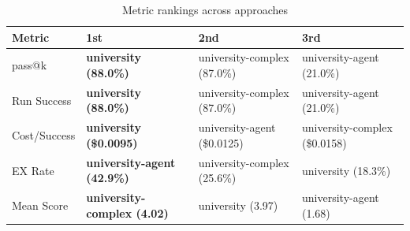 \begin{table}[htbp]
\centering
\caption{Metric rankings across approaches}
\label{tab:rankings}
\begin{tabular}{llll}
\toprule
Metric & 1st & 2nd & 3rd \\
\midrule
pass@k & \textbf{university (88.0\%)} & university-complex (87.0\%) & university-agent (21.0\%) \\
Run Success & \textbf{university (88.0\%)} & university-complex (87.0\%) & university-agent (21.0\%) \\
Cost/Success & \textbf{university (\$0.0095)} & university-agent (\$0.0125) & university-complex (\$0.0158) \\
EX Rate & \textbf{university-agent (42.9\%)} & university-complex (25.6\%) & university (18.3\%) \\
Mean Score & \textbf{university-complex (4.02)} & university (3.97) & university-agent (1.68) \\
\bottomrule
\end{tabular}
\end{table}
